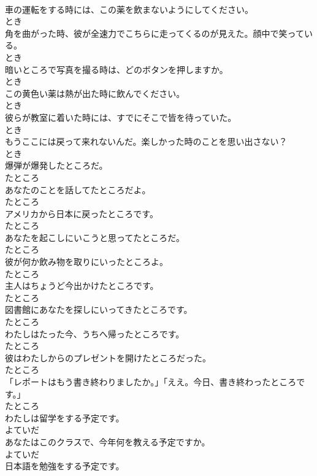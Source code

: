 \documentclass[8pt]{extreport}
\begin{document}
\begin{CJK}{UTF8}{min}
\\	車の運転をする時には、この薬を飲まないようにしてください。	
\\	とき	
\\	角を曲がった時、彼が全速力でこちらに走ってくるのが見えた。顔中で笑っている。	
\\	とき	
\\	暗いところで写真を撮る時は、どのボタンを押しますか。	
\\	とき	
\\	この黄色い薬は熱が出た時に飲んでください。	
\\	とき	
\\	彼らが教室に着いた時には、すでにそこで皆を待っていた。	
\\	とき	
\\	もうここには戻って来れないんだ。楽しかった時のことを思い出さない？	
\\	とき	
\\	爆弾が爆発したところだ。	
\\	たところ	
\\	あなたのことを話してたところだよ。	
\\	たところ	
\\	アメリカから日本に戻ったところです。	
\\	たところ	
\\	あなたを起こしにいこうと思ってたところだ。	
\\	たところ	
\\	彼が何か飲み物を取りにいったところよ。	
\\	たところ	
\\	主人はちょうど今出かけたところです。	
\\	たところ	
\\	図書館にあなたを探しにいってきたところです。	
\\	たところ	
\\	わたしはたった今、うちへ帰ったところです。	
\\	たところ	
\\	彼はわたしからのプレゼントを開けたところだった。	
\\	たところ	
\\	「レポートはもう書き終わりましたか。」「ええ。今日、書き終わったところです。」	
\\	たところ	
\\	わたしは留学をする予定です。	
\\	よていだ	
\\	あなたはこのクラスで、今年何を教える予定ですか。	
\\	よていだ	
\\	日本語を勉強をする予定です。	

\end{CJK}
\end{document}
